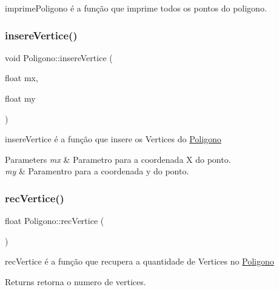 imprime\+Poligono é a função que imprime todos os pontos do poligono. 

\mbox{\label{class_poligono_a8cfc6f93c72f6ac5119a76cd339fc4c3}} 
\subsubsection{\texorpdfstring{insere\+Vertice()}{insereVertice()}}
{\footnotesize\ttfamily void Poligono\+::insere\+Vertice (\begin{DoxyParamCaption}\item[{float}]{mx,  }\item[{float}]{my }\end{DoxyParamCaption})}



insere\+Vertice é a função que insere os Vertices do \mbox{\hyperlink{class_poligono}{Poligono}} 


\begin{DoxyParams}{Parameters}
{\em mx} & Parametro para a coordenada X do ponto. \\
\hline
{\em my} & Paramentro para a coordenada y do ponto. \\
\hline
\end{DoxyParams}
\mbox{\label{class_poligono_a29464a68eb3f3c00bb03f3f467d459c9}} 
\subsubsection{\texorpdfstring{rec\+Vertice()}{recVertice()}}
{\footnotesize\ttfamily float Poligono\+::rec\+Vertice (\begin{DoxyParamCaption}{ }\end{DoxyParamCaption})}



rec\+Vertice é a função que recupera a quantidade de Vertices no \mbox{\hyperlink{class_poligono}{Poligono}} 

\begin{DoxyReturn}{Returns}
retorna o numero de vertices. 
\end{DoxyReturn}
\mbox{\label{class_poligono_a8dbf52a0e4da176f014062f9ec0fbafa}} 
